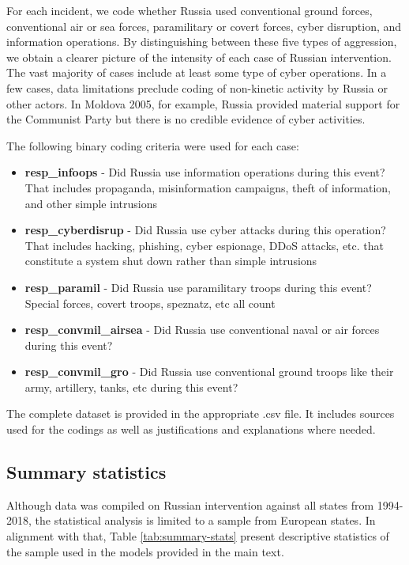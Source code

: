 \documentclass[
]{article}
\providecommand{\tightlist}{%
  \setlength{\itemsep}{0pt}\setlength{\parskip}{0pt}}
\begin{document}
For each incident, we code whether Russia used conventional ground forces, conventional air or sea forces, paramilitary or covert forces, cyber disruption, and information operations. By distinguishing between these five types of aggression, we obtain a clearer picture of the intensity of each case of Russian intervention. The vast majority of cases include at least some type of cyber operations. In a few cases, data limitations preclude coding of non-kinetic activity by Russia or other actors. In Moldova 2005, for example, Russia provided material support for the Communist Party but there is no credible evidence of cyber activities.

The following binary coding criteria were used for each case:

\begin{itemize}
\tightlist
\item
  \textbf{resp\_infoops} - Did Russia use information operations during this event? That includes propaganda, misinformation campaigns, theft of information, and other simple intrusions
\item
  \textbf{resp\_cyberdisrup} - Did Russia use cyber attacks during this operation? That includes hacking, phishing, cyber espionage, DDoS attacks, etc. that constitute a system shut down rather than simple intrusions
\item
  \textbf{resp\_paramil} - Did Russia use paramilitary troops during this event? Special forces, covert troops, speznatz, etc all count
\item
  \textbf{resp\_convmil\_airsea} - Did Russia use conventional naval or air forces during this event?
\item
  \textbf{resp\_convmil\_gro} - Did Russia use conventional ground troops like their army, artillery, tanks, etc during this event?
\end{itemize}

The complete dataset is provided in the appropriate .csv file. It includes sources used for the codings as well as justifications and explanations where needed.

\hypertarget{summary-statistics}{%
\subsection{Summary statistics}\label{summary-statistics}}

Although data was compiled on Russian intervention against all states from 1994-2018, the statistical analysis is limited to a sample from European states. In alignment with that, Table \ref{tab:summary-stats} present descriptive statistics of the sample used in the models provided in the main text.
\end{document}
